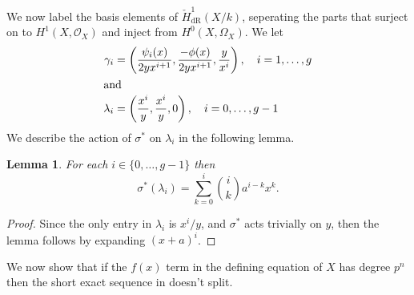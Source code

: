 \documentclass[draft, 11pt]{article} %
\theoremstyle{plain}
\newtheorem{lem}[defn]{Lemma}
\theoremstyle{remark}
\newcommand{\hzero}{{H^0(X,\Omega_X)}}
\newcommand{\hone}{H^1(X,\mathcal{O}_X)}
\newcommand{\cechderhamhone}{\check{H}_{\text {dR}}^1(X/k)}
\begin{document}
We now label the basis elements of $\cechderhamhone$, seperating the parts that surject on to $\hone$ and inject from $\hzero$.
We let
\begin{align*}
\gamma_i & = \left( \frac{\psi_i(x)}{2yx^{i+1}}, \frac{-\phi(x)}{2yx^{i+1}}, \frac{y}{x^i} \right), \quad i = 1, \ldots, g \\
\intertext{and }
\lambda_i & = \left( \frac{x^i}{y}, \frac{x^i}{y}, 0 \right), \quad i = 0, \ldots, g-1
\end{align*}
We describe the action of $\sigma^*$ on $\lambda_i$ in the following lemma.
\begin{lem}
For each $i \in \{ 0, \ldots, g-1\}$ then 
\[
\sigma^*(\lambda_i) = \sum_{k = 0}^i \binom{i}{k}a^{i-k}x^k.
\]
\end{lem}
\begin{proof}
Since the only entry in $\lambda_i$ is $x^i/y$, and $\sigma^*$ acts trivially on $y$, then the lemma follows by expanding $(x+a)^i$.
\end{proof}

We now show that if the $f(x)$ term in the defining equation of $X$ has degree $p^n$ then the short exact sequence in  doesn't split.
\end{document}
